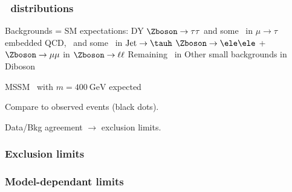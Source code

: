 \begin{frame}
\frametitle{\mTtot\ distributions}

\begin{minipage}[c]{.49\textwidth}

\manip Backgrounds = SM expectations:
\submanip DY $\Zboson\to\tau\tau$ and some \ttbar\ in \colorbox{\EMBcolor}{$\mu\to\tau$ embedded}
\submanip QCD, \Wjets\ and some \ttbar\ in \colorbox{\FAKEScolor}{$\text{Jet}\to\tauh$}
\submanip $\Zboson\to\ele\ele$ + $\Zboson\to\mu\mu$ in \colorbox{\ZLLcolor}{$\Zboson\to\ell\ell$}
\submanip Remaining \ttbar\ in \colorbox{\TTBARcolor}{\ttbar}
\submanip Other small backgrounds in \colorbox{\DIBcolor}{Diboson}

\manip MSSM \Higgs\ with $m=\SI{400}{\GeV}$ expected 

\manip Compare to observed events (black dots).

%
%

\manip Data/Bkg agreement $\to$ exclusion limits.
\end{minipage}
\hfill
\begin{minipage}[c]{.49\textwidth}
\begin{center}
\vspace{-\baselineskip}
\end{center}
\end{minipage}

\end{frame}

\begin{frame}
\frametitle{Exclusion limits}

\end{frame}

\begin{frame}
\frametitle{Model-dependant limits}


\end{frame}